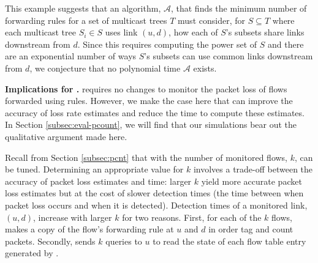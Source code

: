 This example suggests that an algorithm, $\mathcal{A}$, that finds the minimum number of forwarding rules for a set of multicast trees $T$ 
must consider, for $S \subseteq T$ where each multicast tree $S_i \in S$ uses link $(u,d)$, how each of $S$'s subsets share links downstream from $d$.
Since this requires computing the power set of $S$ and there are an exponential number of ways $S$'s subsets can use common links downstream from $d$,
we conjecture that no polynomial time $\mathcal{A}$ exists. %







{\bf Implications for \pcnts.}
\pcnt requires no changes to monitor the packet loss of flows forwarded using \merge rules. However, we make 
the case here that \merge can improve the accuracy of \pcnt loss rate estimates and reduce the time to compute these estimates.  In Section
\ref{subsec:eval-pcount}, we will find that our simulations bear out the qualitative argument made here.

Recall from Section \ref{subsec:pcnt} that with \pcnt the number of monitored flows, $k$, can be tuned.
Determining an appropriate value for $k$ involves a trade-off between the accuracy of packet loss estimates and time: larger $k$ yield more accurate packet loss estimates
but at the cost of slower detection times (the time between when packet loss occurs and when it is detected). Detection times of a monitored link, $(u,d)$, increase with larger $k$
for two reasons. First, for each of the $k$ flows, \pcnt makes a copy of the flow's forwarding rule at $u$ and $d$ in order tag and count packets.  Secondly, 
\pcnt sends $k$ queries to $u$ to read the state of each flow table entry generated by \pcnts. %

